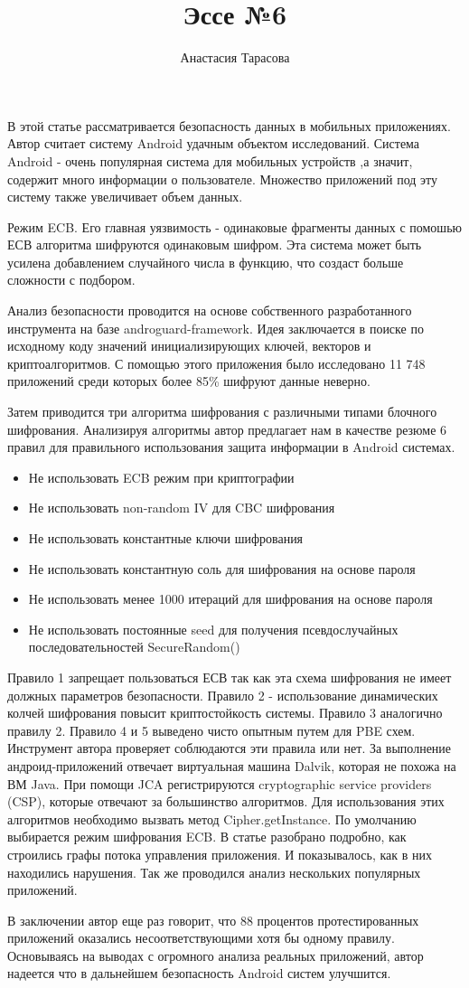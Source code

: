 \documentclass{article}
\title{Эссе №6}
\author{Анастасия Тарасова}
\begin{document}
	\maketitle

В этой статье рассматривается безопасность данных в мобильных приложениях. Автор считает систему Android  удачным объектом исследований. Система Android - очень популярная система для мобильных устройств ,а значит, содержит много информации о пользователе. Множество приложений под эту систему также увеличивает объем данных.

Режим ECB. Его главная уязвимость - одинаковые фрагменты данных с помошью ЕСВ алгоритма шифруются одинаковым шифром. Эта система может быть усилена добавлением случайного числа в функцию, что создаст больше сложности с подбором.

Анализ безопасности проводится на основе собственного разработанного инструмента на базе androguard-framework. Идея заключается в поиске по исходному коду значений инициализирующих ключей, векторов и криптоалгоритмов. С помощью этого приложения было исследовано 11 748 приложений среди которых более 85\% шифруют данные неверно.

Затем приводится три алгоритма шифрования с различными типами блочного шифрования. Анализируя алгоритмы автор предлагает нам в качестве резюме 6 правил для правильного использования защита информации в Android системах.

\begin{itemize}
\item Не использовать ECB режим при криптографии
\item Не использовать non-random IV для CBC шифрования
\item Не использовать константные ключи шифрования
\item Не использовать константную соль для шифрования на основе пароля
\item Не использовать менее 1000 итераций для шифрования на основе пароля
\item Не использовать постоянные seed для получения псевдослучайных последовательностей SecureRandom()
\end{itemize}

Правило 1 запрещает пользоваться ЕСВ так как эта схема шифрования не имеет должных параметров безопасности.
Правило 2 - использование динамических колчей шифрования повысит криптостойкость системы.
Правило 3 аналогично правилу 2.
Правило 4 и 5 выведено чисто опытным путем для PBE схем.
Инструмент автора проверяет соблюдаются эти правила или нет. За выполнение андроид-приложений отвечает виртуальная машина Dalvik, которая не похожа на ВМ Java. При помощи JCA регистрируются cryptographic service providers (CSP), которые отвечают за большинство алгоритмов. Для использования этих алгоритмов необходимо вызвать метод Cipher.getInstance. По умолчанию выбирается режим шифрования ECB. В статье разобрано подробно, как строились графы потока управления приложения. И показывалось, как в них находились нарушения. Так же проводился анализ нескольких популярных приложений.

В заключении автор еще раз говорит, что 88 процентов протестированных приложений оказались несоответствующими хотя бы одному правилу. Основываясь на выводах с огромного анализа реальных приложений, автор надеется что в дальнейшем безопасность Android систем улучшится. 
	
\end{document}
